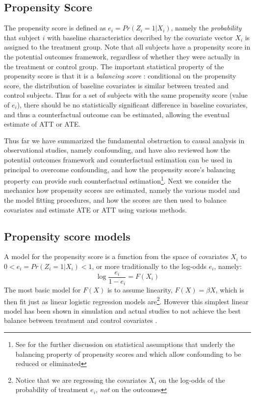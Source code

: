 {\subsection{Propensity Score}
The propensity score is defined as $e_i=Pr(Z_i=1|X_i)$, namely the \emph{probability} that subject $i$ with baseline characteristics described by the covariate vector $X_i$ is assigned to the treatment group.  Note that all subjects have a propensity score in the potential outcomes framework, regardless of whether they were actually in the treatment or control group.  The important statistical property of the propensity score is that it is a \emph{balancing score} \cite{austin2011introduction}: conditional on the propensity score, the distribution of baseline covariates is similar between treated and control subjects.  Thus for a set of subjects with the same propensity score (value of $e_i$), there should be no statistically significant difference in baseline covariates, and thus a counterfactual outcome can be estimated, allowing the eventual estimate of ATT or ATE.  

Thus far we have summarized the fundamental obstruction to causal analysis in observational studies, namely confounding, and have also reviewed how the potential outcomes framework and counterfactual estimation can be used in principal to overcome confounding, and how the propensity score's balancing property can provide such counterfactual estimation\footnote{See \cite{austin2011introduction} for the further discussion on statistical assumptions that underly the balancing property of propensity scores and which allow confounding to be reduced or eliminated}.  Next we consider the mechanics how propensity scores are estimated, namely the various model and the model fitting procedures, and how the scores are then used to balance covariates and estimate ATE or ATT using various methods.  

\subsection{Propensity score models}
A model for the propensity score is a function from the space of covariates $X_i$ to $0<e_i=Pr(Z_i=1|X_i)<1$, or more traditionally to the log-odds $e_i$, namely:  
\begin{equation}
\log\frac{e_i}{1-e_i}=F(X_i)
\end{equation}
The most basic model for $F(X)$ is to assume linearity, $F(X)=\beta X$, which is then fit just as linear logistic regression models are\footnote{Notice that we are regressing the covariates $X_i$ on the log-odds of the probability of treatment $e_i$, \emph{not} on the outcomes}. However this simplest linear model has been shown in simulation and actual studies to not achieve the best balance between treatment and control covariates .  

}

